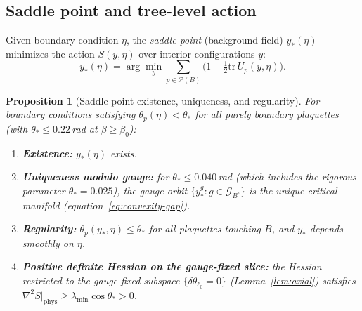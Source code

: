 \documentclass[11pt]{article}
\newtheorem{proposition}[theorem]{Proposition}
\theoremstyle{definition}
\newcommand{\tr}{\mathrm{tr}}
\begin{document}
\subsection{Saddle point and tree-level action}\label{subsec:saddle}

Given boundary condition $\eta$, the \emph{saddle point} (background
field) $y_*(\eta)$ minimizes the action $S(y,\eta)$ over interior
configurations $y$:
\begin{equation}
y_*(\eta)=\arg\min_y\sum_{p\in\mathcal{P}(B)}
\bigl(1-\tfrac{1}{2}\tr\,U_p(y,\eta)\bigr).
\end{equation}

\begin{proposition}[Saddle point existence, uniqueness, and regularity]
\label{prop:saddle}
For boundary conditions satisfying $\theta_p(\eta)<\theta_*$ for all
purely boundary plaquettes (with $\theta_*\le 0.22$\,rad at $\beta\ge\beta_0$):
\begin{enumerate}[nosep,label=(\roman*)]
\item \textbf{Existence:} $y_*(\eta)$ exists.
\item \textbf{Uniqueness modulo gauge:} for $\theta_*\le 0.040$\,rad
(which includes the rigorous parameter $\theta_*=0.025$),
the gauge orbit
$\{y_*^g:g\in\mathcal{G}_{B^\circ}\}$ is the unique critical manifold
(equation~\eqref{eq:convexity-gap}).
\item \textbf{Regularity:} $\theta_p(y_*,\eta)\le\theta_*$ for all
plaquettes touching $B$, and $y_*$ depends smoothly on $\eta$.
\item \textbf{Positive definite Hessian on the gauge-fixed slice:} the Hessian
restricted to the gauge-fixed subspace $\{\delta\theta_{\ell_0}=0\}$
(Lemma~\ref{lem:axial}) satisfies
$\nabla^2 S|_{\mathrm{phys}}\ge\lambda_{\min}\cos\theta_*>0$.
\end{enumerate}
\end{proposition}
\end{document}

